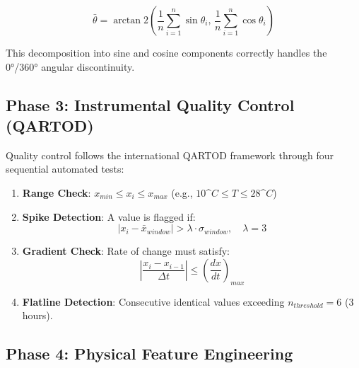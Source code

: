 \documentclass[12pt,a4paper]{article}
\newcommand{\degC}{$^\circ$C}
\begin{document}
\begin{equation}
    \bar{\theta} = \arctan2\left(\frac{1}{n}\sum_{i=1}^{n} \sin\theta_i,\, \frac{1}{n}\sum_{i=1}^{n} \cos\theta_i\right)
    \label{eq:circular_mean}
\end{equation}

This decomposition into sine and cosine components correctly handles the 0°/360° angular discontinuity.

\subsection{Phase 3: Instrumental Quality Control (QARTOD)}
\label{sec:quality_control}

Quality control follows the international QARTOD framework \cite{qartod_manual} through four sequential automated tests:

\begin{enumerate}
    \item \textbf{Range Check}: $x_{min} \leq x_i \leq x_{max}$ (e.g., $10\degC \leq T \leq 28\degC$)
    
    \item \textbf{Spike Detection}: A value is flagged if:
    \begin{equation}
        |x_i - \bar{x}_{window}| > \lambda \cdot \sigma_{window}, \quad \lambda = 3
        \label{eq:spike}
    \end{equation}
    
    \item \textbf{Gradient Check}: Rate of change must satisfy:
    \begin{equation}
        \left|\frac{x_i - x_{i-1}}{\Delta t}\right| \leq \left(\frac{dx}{dt}\right)_{max}
    \end{equation}
    
    \item \textbf{Flatline Detection}: Consecutive identical values exceeding $n_{threshold} = 6$ (3 hours).
\end{enumerate}

\subsection{Phase 4: Physical Feature Engineering}
\label{sec:feature_engineering}
\end{document}
